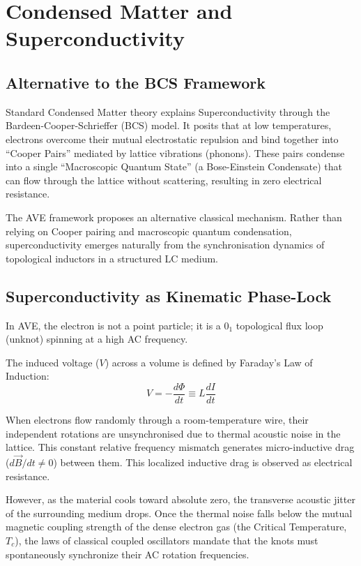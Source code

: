 \chapter{Condensed Matter and Superconductivity}
\label{ch:condensed_matter}

\section{Alternative to the BCS Framework}
Standard Condensed Matter theory explains Superconductivity through the Bardeen-Cooper-Schrieffer (BCS) model. It posits that at low temperatures, electrons overcome their mutual electrostatic repulsion and bind together into ``Cooper Pairs'' mediated by lattice vibrations (phonons). These pairs condense into a single ``Macroscopic Quantum State'' (a Bose-Einstein Condensate) that can flow through the lattice without scattering, resulting in zero electrical resistance.

The AVE framework proposes an alternative classical mechanism. Rather than relying on Cooper pairing and macroscopic quantum condensation, superconductivity emerges naturally from the synchronisation dynamics of topological inductors in a structured LC medium.

\section{Superconductivity as Kinematic Phase-Lock}
In AVE, the electron is not a point particle; it is a $0_1$ topological flux loop (unknot) spinning at a high AC frequency. 

The induced voltage ($V$) across a volume is defined by Faraday's Law of Induction:
\begin{equation}
    V = - \frac{d\Phi}{dt} \equiv L \frac{dI}{dt}
\end{equation}

When electrons flow randomly through a room-temperature wire, their independent rotations are unsynchronised due to thermal acoustic noise in the lattice. This constant relative frequency mismatch generates micro-inductive drag ($d\vec{B}/dt \neq 0$) between them. This localized inductive drag is observed as electrical resistance.

However, as the material cools toward absolute zero, the transverse acoustic jitter of the surrounding medium drops. Once the thermal noise falls below the mutual magnetic coupling strength of the dense electron gas (the Critical Temperature, $T_c$), the laws of classical coupled oscillators mandate that the knots must spontaneously synchronize their AC rotation frequencies.

